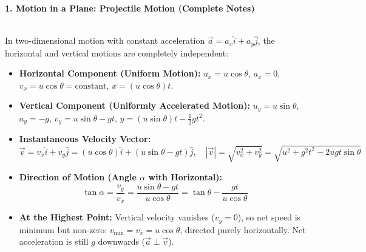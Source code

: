 \documentclass[11pt,a4paper]{article}
\begin{document}
\begin{tcolorbox}[chapterbanner]
  {\Large \textbf{\textsf{1. Motion in a Plane: Projectile Motion (Complete Notes)}}}
\end{tcolorbox}
\vspace{4pt}

\noindent{\large\textbf{\textsf{\textcolor{primaryDark}{1.1 Kinematic Resolution of 2D Motion}}}}\\[3pt]
In two-dimensional motion with constant acceleration $\vec{a} = a_x\hat{i} + a_y\hat{j}$, the horizontal and vertical motions are completely independent:
\begin{itemize}[leftmargin=14pt,itemsep=2pt]
  \item \textbf{Horizontal Component (Uniform Motion):} $u_x = u\cos\theta$, $a_x = 0$, $v_x = u\cos\theta = \text{constant}$, $x = (u\cos\theta)t$.
  \item \textbf{Vertical Component (Uniformly Accelerated Motion):} $u_y = u\sin\theta$, $a_y = -g$, $v_y = u\sin\theta - gt$, $y = (u\sin\theta)t - \frac{1}{2}gt^2$.
  \item \textbf{Instantaneous Velocity Vector:}
  \[
    \vec{v} = v_x\hat{i} + v_y\hat{j} = (u\cos\theta)\hat{i} + (u\sin\theta - gt)\hat{j}, \quad |\vec{v}| = \sqrt{v_x^2 + v_y^2} = \sqrt{u^2 + g^2 t^2 - 2ugt\sin\theta}
  \]
  \item \textbf{Direction of Motion (Angle $\alpha$ with Horizontal):}
  \[
    \tan\alpha = \frac{v_y}{v_x} = \frac{u\sin\theta - gt}{u\cos\theta} = \tan\theta - \frac{gt}{u\cos\theta}
  \]
  \item \textbf{At the Highest Point:} Vertical velocity vanishes ($v_y = 0$), so net speed is minimum but non-zero: $v_{\min} = v_x = u\cos\theta$, directed purely horizontally. Net acceleration is still $g$ downwards ($\vec{a} \perp \vec{v}$).
\end{itemize}
\end{document}
